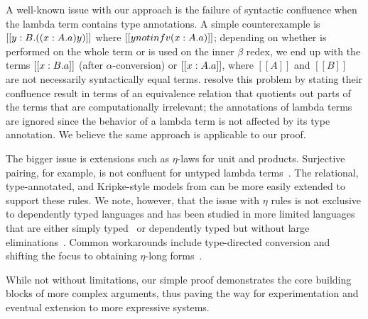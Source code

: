 \documentclass[\ifpublic nolinenum\else\fi,online,OA]{jfp}
\newcommand{\scw}[1]{}
\newcommand{\lang}{$\lambda^{\Pi}$\xspace}
\theoremstyle{definition}
\begin{document}
A well-known issue with our approach is the failure of syntactic
confluence when the lambda term contains type annotations. A simple
counterexample is $[[\- y : B . ((\- x : A . a) y)]]$ where $[[y notin
fv (\- x : A . a)]]$; depending on
whether  is performed on the whole term or
 is used on the inner $\beta$ redex, we end up with the
terms $[[\- x : B . a]]$ (after $\alpha$-conversion) or $[[\- x : A . a]]$, where $[[A]]$ and $[[B]]$ are not
necessarily syntactically equal terms. \citet{choudhury:ddc} resolve
this problem by stating their confluence result in terms of an
equivalence relation that quotients out parts of the terms that are
computationally irrelevant; the annotations of lambda terms are
ignored since the behavior of a lambda term is not affected by its
type annotation. We believe the same approach is applicable to our
proof.

The bigger issue is extensions such as $\eta$-laws for unit and
products. Surjective pairing, for example, is not confluent for untyped lambda
terms~\cite{KLOP198997}. The relational, type-annotated, and Kripke-style models from
\citet{nbeincoq,decagda,martin-lof-a-la-coq} can be more easily
extended to support these rules.
We note, however, that the issue with $\eta$ rules is not exclusive to dependently
typed languages and has been studied in more limited languages that
are either simply
typed~\citep{pierce2004advanced,pfenning1997computation} or
dependently typed but without large
eliminations~\citep{harper2005equivalence,
abel2005untypedconvsurjective}. Common workarounds include
type-directed conversion and shifting the focus to obtaining
$\eta$-long forms~\cite{Abel12}.

While not without limitations, our simple proof demonstrates the core
building blocks of more complex arguments, thus paving the way for experimentation
and eventual extension to more expressive systems.\scw{I tried to reword your
sentence, but I am still not happy with it.}

\end{document}
